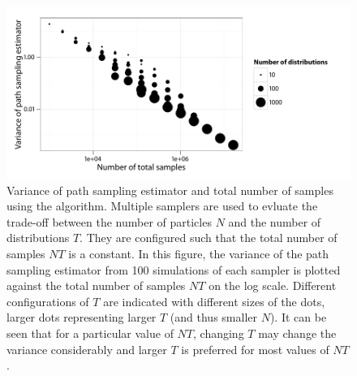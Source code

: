 \begin{figure}[t]
  \UseAltLinespread
  \includegraphics[width=\linewidth]{fig_src/Particle_Iter_Var}
  \caption[Variance of path sampling estimator and total number of samples
  using \protect\smc algorithm]
  {Variance of path sampling estimator and total number of samples using the
    \smc[2] algorithm. Multiple samplers are used to evluate the trade-off
    between the number of particles $N$ and the number of distributions $T$.
    They are configured such that the total number of samples $NT$ is a
    constant. In this figure, the variance of the path sampling estimator from
    100 simulations of each sampler is plotted against the total number of
    samples $NT$ on the log scale. Different configurations of $T$ are
    indicated with different sizes of the dots, larger dots representing
    larger $T$ (and thus smaller $N$). It can be seen that for a particular
    value of $NT$, changing $T$ may change the variance considerably and
    larger $T$ is preferred for most values of $NT$.}
  \label{fig:particle iter num}
\end{figure}
